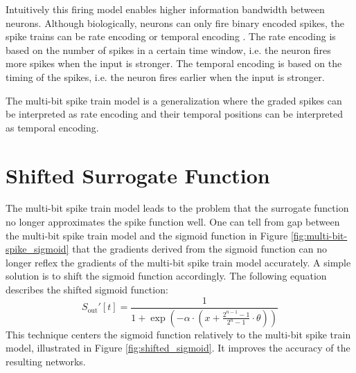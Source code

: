     Intuitively this firing model enables higher information bandwidth between neurons. Although biologically, neurons can only fire binary encoded spikes, the spike trains can be rate encoding \cite{jphysiol.1962.sp006837} or temporal encoding \cite{doi:10.1073/pnas.0610368104}. The rate encoding is based on the number of spikes in a certain time window, i.e. the neuron fires more spikes when the input is stronger. The temporal encoding is based on the timing of the spikes, i.e. the neuron fires earlier when the input is stronger.

    The multi-bit spike train model is a generalization where the graded spikes can be interpreted as rate encoding and their temporal positions can be interpreted as temporal encoding. 

\section{Shifted Surrogate Function}
\label{sec:shifted-surrogate-function}
    The multi-bit spike train model leads to the problem that the surrogate function no longer approximates the spike function well. One can tell from gap between the multi-bit spike train model and the sigmoid function in Figure \ref{fig:multi-bit-spike_sigmoid} that the gradients derived from the sigmoid function can no longer reflex the gradients of the multi-bit spike train model accurately.
    A simple solution is to shift the sigmoid function accordingly. The following equation describes the shifted sigmoid function:
    \begin{equation}
        S_{\text{out}}'[t] = \frac{1}{1 + \exp(-\alpha \cdot (x + \frac{2^{n-1}-1}{2^n-1}\cdot\theta))}
    \end{equation}
    This technique centers the sigmoid function relatively to the multi-bit spike train model, illustrated in Figure \ref{fig:shifted_sigmoid}. It improves the accuracy of the resulting networks. 
